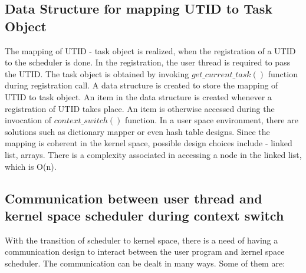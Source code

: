 \subsection{Data Structure for mapping UTID to Task Object}

The mapping of UTID - task object is realized, when the registration of a UTID to the scheduler is done. 
In the registration, the user thread is required to pass the UTID. 
The task object is obtained by invoking $get\_current\_task()$ function during registration call. 
A data structure is created to store the mapping of UTID to task object. 
An item in the data structure is created whenever a registration of UTID takes place. 
An item is otherwise accessed during the invocation of $context\_switch()$ function. 
In a user space environment, there are solutions such as dictionary mapper or even hash table designs. 
Since the mapping is coherent in the kernel space, possible design choices include - linked list, arrays. 
There is a complexity associated in accessing a node in the linked list, which is O(n).

\subsection{Communication between user thread and kernel space scheduler during context switch} 

With the transition of scheduler to kernel space, there is a need of having a communication design to interact between the user program and kernel space scheduler. 
The communication can be dealt in many ways\cite{commkernelanduser}. 
Some of them are:

